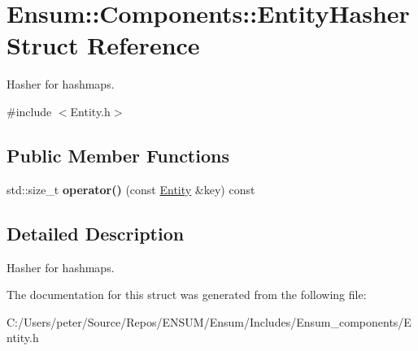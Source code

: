 \hypertarget{struct_ensum_1_1_components_1_1_entity_hasher}{}\section{Ensum\+:\+:Components\+:\+:Entity\+Hasher Struct Reference}
\label{struct_ensum_1_1_components_1_1_entity_hasher}


Hasher for hashmaps.  




{\ttfamily \#include $<$Entity.\+h$>$}

\subsection*{Public Member Functions}
\begin{DoxyCompactItemize}
\item 
std\+::size\+\_\+t {\bfseries operator()} (const \hyperlink{struct_ensum_1_1_components_1_1_entity}{Entity} \&key) const \hypertarget{struct_ensum_1_1_components_1_1_entity_hasher_a9d4b4eb8467c10ad0df24bb12f683c5b}{}\label{struct_ensum_1_1_components_1_1_entity_hasher_a9d4b4eb8467c10ad0df24bb12f683c5b}

\end{DoxyCompactItemize}


\subsection{Detailed Description}
Hasher for hashmaps. 

The documentation for this struct was generated from the following file\+:\begin{DoxyCompactItemize}
\item 
C\+:/\+Users/peter/\+Source/\+Repos/\+E\+N\+S\+U\+M/\+Ensum/\+Includes/\+Ensum\+\_\+components/Entity.\+h\end{DoxyCompactItemize}
